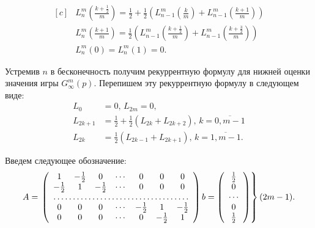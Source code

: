 \begin{equation}
\label{eq:lower_bound:recurrence_finite}
\begin{aligned}[c]
&L_n^m\left(\frac{k+\frac{1}{2}}{m}\right) = 
    \frac{1}{2} + \frac{1}{2}\left(
        L_{n-1}^m\left(\frac{k}{m}\right) + 
        L_{n-1}^m\left(\frac{k + 1}{m}\right)
    \right) \\
&L_n^m\left(\frac{k+1}{m}\right) = 
    \frac{1}{2}\left(
        L_{n-1}^m\left(\frac{k+\frac{1}{2}}{m}\right) + 
        L_{n-1}^m\left(\frac{k+\frac{3}{2}}{m}\right)
    \right) \\
&L_n^m(0) = L_n^m(1) = 0.
\end{aligned}
\end{equation}

Устремив $ n $ в бесконечность получим рекуррентную формулу для нижней оценки значения игры $ G_\infty^m(p) $. Перепишем эту рекуррентную формулу в следующем виде:
\begin{equation}
\label{eq:lower_bound:recurrence_infinite}
\begin{aligned}
L_0 &= 0,\, L_{2m} = 0, \\
L_{2k + 1} &= \frac{1}{2} + \frac{1}{2} (L_{2k} + L_{2k + 2}), \, 
    k = \overline{0,m-1}\\
L_{2k} &= \frac{1}{2} (L_{2k - 1} + L_{2k + 1}), \, 
    k = \overline{1,m-1}.
\end{aligned}
\end{equation}

Введем следующее обозначение:
\begin{equation}
A = \left.
\left(\begin{array}{ccccccc}
    1 & -\frac{1}{2} & 0 & \cdots & 0 & 0 & 0 \\
    -\frac{1}{2} & 1 & -\frac{1}{2} & \cdots & 0 & 0 & 0 \\
    \hdotsfor{7} \\
    0 & 0 & 0 & \cdots & -\frac{1}{2} & 1 & -\frac{1}{2} \\
    0 & 0 & 0 & \cdots & 0 & -\frac{1}{2} & 1 \\
\end{array}\right)
b = \left(\begin{array}{c}
\frac{1}{2} \\
0\\
\cdots\\
0 \\
\frac{1}{2}
\end{array}\right)
\right\} (2m - 1).
\end{equation}


